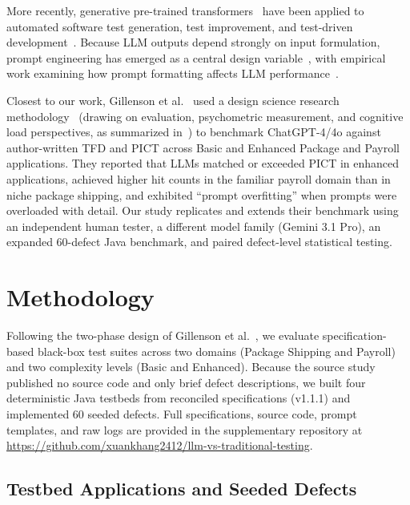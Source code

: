 \documentclass[acmsmall]{acmart}
\begin{document}
More recently, generative pre-trained transformers~\cite{Brown2020, OpenAI2023} have been applied to automated software test generation, test improvement, and test-driven development~\cite{Alshahwan2024, Cassieri2024, Ouedraogo2024, Yang2024, Baqar2025}. Because LLM outputs depend strongly on input formulation, prompt engineering has emerged as a central design variable~\cite{Geroimenko2025}, with empirical work examining how prompt formatting affects LLM performance~\cite{He2024}.

Closest to our work, Gillenson et al.~\cite{Gillenson2026} used a design science research methodology~\cite{Hevner2004, Peffers2007} (drawing on evaluation, psychometric measurement, and cognitive load perspectives, as summarized in~\cite{Gillenson2026}) to benchmark ChatGPT-4/4o against author-written TFD and PICT across Basic and Enhanced Package and Payroll applications. They reported that LLMs matched or exceeded PICT in enhanced applications, achieved higher hit counts in the familiar payroll domain than in niche package shipping, and exhibited ``prompt overfitting'' when prompts were overloaded with detail. Our study replicates and extends their benchmark using an independent human tester, a different model family (Gemini 3.1 Pro), an expanded 60-defect Java benchmark, and paired defect-level statistical testing.

\section{Methodology}
\label{sec:method}

Following the two-phase design of Gillenson et al.~\cite{Gillenson2026}, we evaluate specification-based black-box test suites across two domains (Package Shipping and Payroll) and two complexity levels (Basic and Enhanced). Because the source study published no source code and only brief defect descriptions, we built four deterministic Java testbeds from reconciled specifications (v1.1.1) and implemented 60 seeded defects. Full specifications, source code, prompt templates, and raw logs are provided in the supplementary repository at \url{https://github.com/xuankhang2412/llm-vs-traditional-testing}.

\subsection{Testbed Applications and Seeded Defects}
\label{sec:testbeds}
\end{document}
